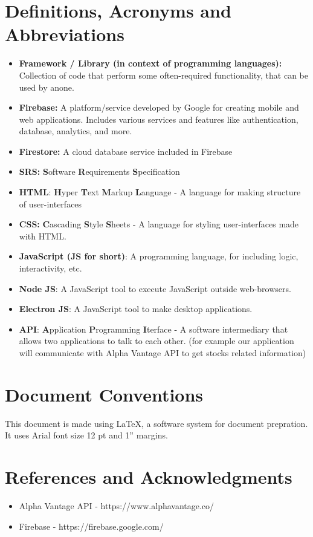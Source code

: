 \documentclass[12 pt, a4paper]{report}
\begin{document}
	\section {Definitions, Acronyms and Abbreviations}
		
	\begin{itemize}
		\item \textbf{Framework / Library (in context of programming languages):} Collection of code that perform some often-required functionality, that can be used by anone.
		\item \textbf{Firebase:} A platform/service developed by Google for creating mobile and web applications. Includes various services and features like authentication, database, analytics, and more.
		\item \textbf{Firestore:} A cloud database service included in Firebase
		\item \textbf{SRS:} \textbf{S}oftware \textbf{R}equirements \textbf{S}pecification
		\item \textbf{HTML}: \textbf{H}yper  \textbf{T}ext \textbf{M}arkup \textbf{L}anguage - A language for making structure of user-interfaces
		\item \textbf{CSS:} \textbf{C}ascading \textbf{S}tyle \textbf{S}heets - A language for styling user-interfaces made with HTML.
		\item \textbf{JavaScript (JS for short)}: A programming language, for including logic, interactivity, etc.
		\item \textbf{Node JS}: A JavaScript tool to execute JavaScript outside web-browsers.
		\item \textbf{Electron JS}: A JavaScript tool to make desktop applications.
		\item \textbf{API}: \textbf{A}pplication \textbf{P}rogramming \textbf{I}terface - A software intermediary that allows two applications to talk to each other. (for example our application will communicate with Alpha Vantage API to get stocks related information)
		
	\end{itemize}
	
	
	\section {Document Conventions}
	This document is made using LaTeX, a software system for document prepration. It uses Arial font size 12 pt and 1” margins.
	
	\section {References and Acknowledgments}
	\begin{itemize}
		\item Alpha Vantage API - https://www.alphavantage.co/
		\item Firebase - https://firebase.google.com/
	\end{itemize}
	
\end{document}

